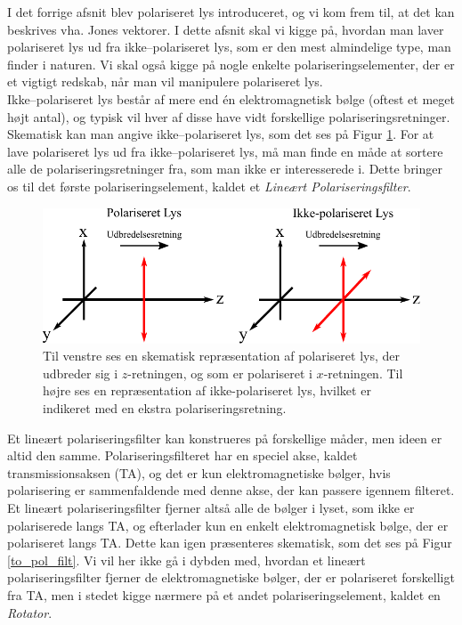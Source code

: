 I det forrige afsnit blev polariseret lys introduceret, og vi kom frem til, at det kan beskrives vha. Jones vektorer. I dette afsnit skal vi kigge på, hvordan man laver polariseret lys ud fra ikke--polariseret lys, som er den mest almindelige type, man finder i naturen. Vi skal også kigge på nogle enkelte polariseringselementer, der er et vigtigt redskab, når man vil manipulere polariseret lys.\\

Ikke--polariseret lys består af mere end én elektromagnetisk bølge (oftest et meget højt antal), og typisk vil hver af disse have vidt forskellige polariseringsretninger. Skematisk kan man angive ikke--polariseret lys, som det ses på Figur \ref{ikke_pol_lys}. For at lave polariseret lys ud fra ikke--polariseret lys, må man finde en måde at sortere alle de polariseringsretninger fra, som man ikke er interesserede i. Dette bringer os til det første polariseringselement, kaldet et \emph{Lineært Polariseringsfilter}.\\

\begin{figure}[h!]
	\centering
	\includegraphics[scale=0.9]{Elektrodynamik/ikke_pol_lys.pdf}
	\caption{Til venstre ses en skematisk repræsentation af polariseret lys, der udbreder sig i $z$-retningen, og som er polariseret i $x$-retningen. Til højre ses en repræsentation af ikke-polariseret lys, hvilket er indikeret med en ekstra polariseringsretning.}
	\label{ikke_pol_lys}
\end{figure} 

Et lineært polariseringsfilter kan konstrueres på forskellige måder, men ideen er altid den samme. Polariseringsfilteret har en speciel akse, kaldet transmissionsaksen (TA), og det er kun elektromagnetiske bølger, hvis polarisering er sammenfaldende med denne akse, der kan passere igennem filteret. Et lineært polariseringsfilter fjerner altså alle de bølger i lyset, som ikke er polariserede langs TA, og efterlader kun en enkelt elektromagnetisk bølge, der er polariseret langs TA. Dette kan igen præsenteres skematisk, som det ses på Figur \ref{to_pol_filt}. Vi vil her ikke gå i dybden med, hvordan et lineært polariseringsfilter fjerner de elektromagnetiske bølger, der er polariseret forskelligt fra TA, men i stedet kigge nærmere på et andet polariseringselement, kaldet en \emph{Rotator}.\\

